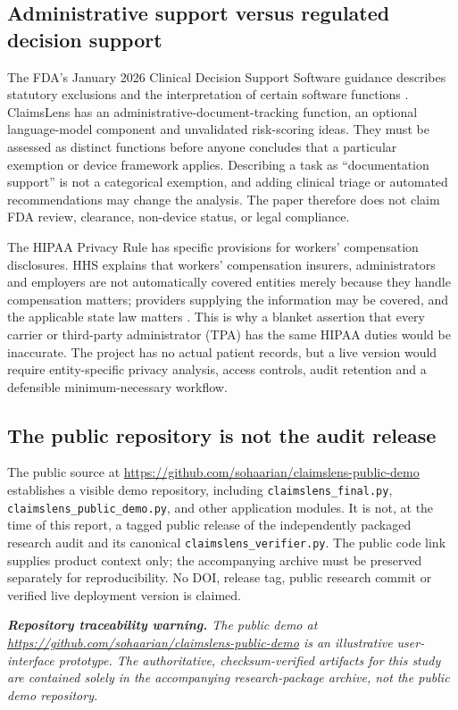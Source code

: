 \documentclass[11pt,twocolumn]{article}
\newcommand{\code}[1]{\texttt{#1}}
\begin{document}
\subsection{Administrative support versus regulated decision support}
The FDA's January 2026 Clinical Decision Support Software guidance describes statutory exclusions and the interpretation of certain software functions \cite{fda2026}. ClaimsLens has an administrative-document-tracking function, an optional language-model component and unvalidated risk-scoring ideas. They must be assessed as distinct functions before anyone concludes that a particular exemption or device framework applies. Describing a task as ``documentation support'' is not a categorical exemption, and adding clinical triage or automated recommendations may change the analysis. The paper therefore does not claim FDA review, clearance, non-device status, or legal compliance.

The HIPAA Privacy Rule has specific provisions for workers' compensation disclosures. HHS explains that workers' compensation insurers, administrators and employers are not automatically covered entities merely because they handle compensation matters; providers supplying the information may be covered, and the applicable state law matters \cite{hhsworkers}. This is why a blanket assertion that every carrier or third-party administrator (TPA) has the same HIPAA duties would be inaccurate. The project has no actual patient records, but a live version would require entity-specific privacy analysis, access controls, audit retention and a defensible minimum-necessary workflow.

\subsection{The public repository is not the audit release}
The public source at \url{https://github.com/sohaarian/claimslens-public-demo} establishes a visible demo repository, including \code{claimslens\_final.py}, \code{claimslens\_public\_demo.py}, and other application modules. It is not, at the time of this report, a tagged public release of the independently packaged research audit and its canonical \code{claimslens\_verifier.py}. The public code link supplies product context only; the accompanying archive must be preserved separately for reproducibility. No DOI, release tag, public research commit or verified live deployment version is claimed.

\noindent\textit{\textbf{Repository traceability warning.} The public demo at \url{https://github.com/sohaarian/claimslens-public-demo} is an illustrative user-interface prototype. The authoritative, checksum-verified artifacts for this study are contained solely in the accompanying research-package archive, not the public demo repository.}
\end{document}
